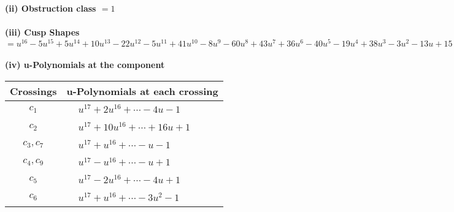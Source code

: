 \documentclass[1p]{elsarticle_modified}
\theoremstyle{definition}
\begin{document}
\flushleft \textbf{(ii) Obstruction class $= 1$}\\~\\
\flushleft \textbf{(iii) Cusp Shapes $= u^{16}-5 u^{15}+5 u^{14}+10 u^{13}-22 u^{12}-5 u^{11}+41 u^{10}-8 u^9-60 u^8+43 u^7+36 u^6-40 u^5-19 u^4+38 u^3-3 u^2-13 u+15$}\\~\\
\newpage\renewcommand{\arraystretch}{1}
\flushleft \textbf{(iv) u-Polynomials at the component}\newline \\
\begin{tabular}{m{50pt}|m{274pt}}
Crossings & \hspace{64pt}u-Polynomials at each crossing \\
\hline $$\begin{aligned}c_{1}\end{aligned}$$&$\begin{aligned}
&u^{17}+2 u^{16}+\cdots-4 u-1
\end{aligned}$\\
\hline $$\begin{aligned}c_{2}\end{aligned}$$&$\begin{aligned}
&u^{17}+10 u^{16}+\cdots+16 u+1
\end{aligned}$\\
\hline $$\begin{aligned}c_{3},c_{7}\end{aligned}$$&$\begin{aligned}
&u^{17}+u^{16}+\cdots- u-1
\end{aligned}$\\
\hline $$\begin{aligned}c_{4},c_{9}\end{aligned}$$&$\begin{aligned}
&u^{17}- u^{16}+\cdots- u+1
\end{aligned}$\\
\hline $$\begin{aligned}c_{5}\end{aligned}$$&$\begin{aligned}
&u^{17}-2 u^{16}+\cdots-4 u+1
\end{aligned}$\\
\hline $$\begin{aligned}c_{6}\end{aligned}$$&$\begin{aligned}
&u^{17}+u^{16}+\cdots-3 u^2-1
\end{aligned}$\\

\end{tabular}
\end{document}
